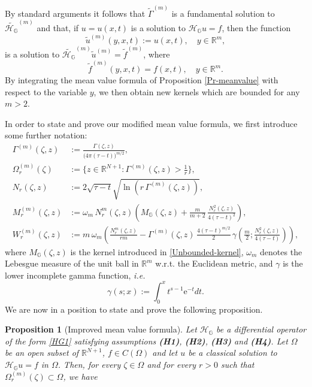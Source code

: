 \documentclass[11pt,a4paper]{article}
\newtheorem{proposition}[theorem]{\bf Proposition}
\numberwithin{equation}{section}
\newcommand{\R}{\mathbb{R}}
\def \GG {{\mathbb{G}}}
\def \H {\mathscr{H}_\GG}
\def \t {{\tau}}
\def \z {{\zeta}}
\begin{document}
{By standard arguments it follows that $\tilde{\Gamma}^{(m)}$ is a fundamental solution to $\tilde{\H}^{(m)}$ and that, if $u=u(x,t)$ is a solution to $\H u =f$, then the function
\begin{equation}\label{Eq:defutilde}
	\tilde{u}^{(m)}(y,x,t):=u(x,t), \quad y \in \R^m,
\end{equation}
is a solution to $\tilde{\H}^{(m)}\tilde{u}^{(m)}=\tilde{f}^{(m)}$, where
\begin{equation*}
	\tilde{f}^{(m)}(y,x,t)=f(x,t), \quad y \in \R^m.
\end{equation*}
By integrating the mean value formula of Proposition \ref{Pr-meanvalue} with respect to the variable $y$, we then obtain new kernels which are bounded for any $m>2$. {\color{black}In order to state and prove our modified mean value formula, we first introduce some further notation:
\begin{equation}\label{Eq:kernels-m}
	\begin{aligned}
		\Gamma^{(m)}(\z,z)&:=\frac{\Gamma(\z,z)}{\big( 4\pi(\t-t)\big)^{m/2}},\\ 
		\Omega_r^{(m)}(\z)&:=\biggl\{ z \in \R^{N+1}:\Gamma^{(m)}(\z,z)  >\frac{1}{r} \biggr\},\\
		N_r(\z,z)&:=2\sqrt{\t-t}\sqrt{\ln\left( r\, \Gamma^{(m)}(\z,z)\right)},\\ 
		M_r^{(m)}(\z,z)&:=\omega_m \,N_r^m(\z,z) \left( M_\GG(\z,z)+\frac{m}{m+2}\,\frac{N_r^2(\z,z)}{4(\t-t)^2}\right),\\
		W_r^{(m)}(\z,z)&:=m\,\omega_m \left(\frac{N_r^m(\z,z)}{rm} -\Gamma^{(m)}(\z,z)\,\frac{4(\t-t)^{m/2}}{2}\, \gamma\left( \frac{m}{2};\frac{N_r^2(\z,z)}{4(\t-t)}\right)\right),
	\end{aligned}
\end{equation}
where $M_\GG(\z,z)$ is the kernel introduced in \eqref{Unbounded-kernel}, $\omega_m$ denotes the Lebesgue measure of the unit ball in $\R^m$  w.r.t. the Euclidean metric, and $\gamma$ is the lower incomplete gamma function, \emph{i.e.}
\begin{equation}\label{Eq:gammafunction}
	\gamma(s;x):=\int_0^x t^{s-1}\mathrm{e}^{-t}dt.
\end{equation}
We are now in a position to state and prove the following proposition. 
\begin{proposition}[Improved mean value formula]\label{prop-meanvalue}
	Let $\H$ be a differential operator of the form \eqref{HG1} satisfying assumptions \textbf{(H1)}, \textbf{(H2)}, \textbf{(H3)} and \textbf{(H4)}. Let $\Omega$ be an open subset of $\R^{N+1}$, $f \in C(\Omega)$ and let $u$ be a classical solution to $\H u =f$ in $\Omega$. Then, for every $\z \in \Omega$ and for every $r >0$ such that $\Omega^{(m)}_r(\z) \subset \Omega$, we have 

\end{proposition}}}
\end{document}
